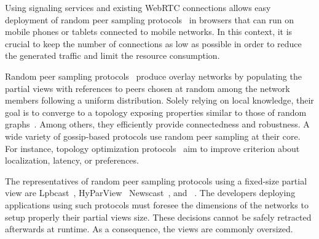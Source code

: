 
Using signaling services and existing WebRTC connections allows easy deployment
of random peer sampling protocols~\cite{jelasity2004peer} in browsers that can
run on mobile phones or tablets connected to mobile networks. In this context,
it is crucial to keep the number of connections as low as possible in order to
reduce the generated traffic and limit the resource consumption.

Random peer sampling protocols~\cite{jelasity2004peer, jelasity2007gossip}
produce overlay networks by populating the partial views with references to
peers chosen at random among the network members following a uniform
distribution. Solely relying on local knowledge, their goal is to converge to a
topology exposing properties similar to those of random
graphs~\cite{erdos1959random}. Among others, they efficiently provide
connectedness and robustness. A wide variety of gossip-based protocols use
random peer sampling at their core. For instance, topology optimization
protocols~\cite{voulgaris2005epidemic, jelasity2009tman} aim to improve
criterion about localization, latency, or preferences.

The representatives of random peer sampling protocols using a fixed-size partial
view are Lpbcast~\cite{eugster2003lightweight},
HyParView~\cite{leitao2007hyparview} Newscast~\cite{tolgyeski2009adaptive}, and
\CYCLON~\cite{voulgaris2005cyclon}. The developers deploying applications using
such protocols must foresee the dimensions of the networks to setup properly
their partial views size. These decisions cannot be safely retracted afterwards
at runtime. As a consequence, the views are commonly oversized.

